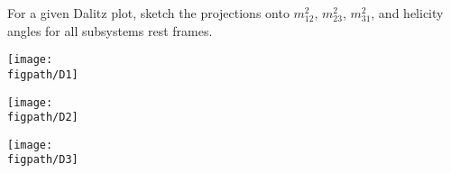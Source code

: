 For a given Dalitz plot, sketch the projections onto $m_{12}^2$, $m_{23}^2$, $m_{31}^2$,
and helicity angles for all subsystems rest frames.

\begin{center}
    \centering
    \begin{minipage}[c]{0.3\textwidth}
        \texttt{[image: \\figpath/D1]}
    \end{minipage}
    \hfill
    \begin{minipage}[c]{0.3\textwidth}
        \texttt{[image: \\figpath/D2]}
    \end{minipage}
    \hfill
    \begin{minipage}[c]{0.3\textwidth}
        \texttt{[image: \\figpath/D3]}
    \end{minipage}
\end{center}

\begin{solution}


\end{solution}